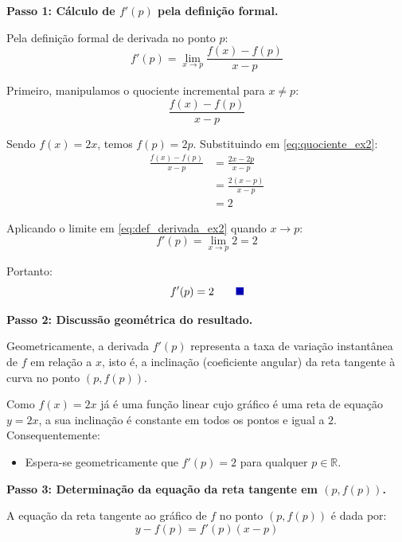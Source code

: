 \documentclass[12pt,a4paper]{article}
\newcommand{\qedsymbolmath}{\tag*{\textcolor{blue!70!black}{\rule{1.6ex}{1.6ex}}}}
\begin{document}
\textbf{Passo 1: Cálculo de $f'(p)$ pela definição formal.}

Pela definição formal de derivada no ponto $p$:
\begin{equation}
    f'(p) = \lim_{x \to p} \frac{f(x) - f(p)}{x - p} \label{eq:def_derivada_ex2}
\end{equation}

Primeiro, manipulamos o quociente incremental para $x \neq p$:
\begin{equation}
    \frac{f(x) - f(p)}{x - p} \label{eq:quociente_ex2}
\end{equation}

Sendo $f(x) = 2x$, temos $f(p) = 2p$. Substituindo em \eqref{eq:quociente_ex2}:
\begin{align*}
    \frac{f(x) - f(p)}{x - p} &= \frac{2x - 2p}{x - p} \\[0.25cm]
    &= \frac{2(x - p)}{x - p} \\[0.25cm]
    &= 2
\end{align*}

Aplicando o limite em \eqref{eq:def_derivada_ex2} quando $x \to p$:
\[
f'(p) = \lim_{x \to p} 2 = 2
\]

Portanto:
\begin{equation*}
    f'(p) = 2 \qedsymbolmath
\end{equation*}

\vspace{0.3cm}
\textbf{Passo 2: Discussão geométrica do resultado.}

Geometricamente, a derivada $f'(p)$ representa a taxa de variação instantânea de $f$ em relação a $x$, isto é, a inclinação (coeficiente angular) da reta tangente à curva no ponto $(p, f(p))$.

Como $f(x) = 2x$ já é uma função linear cujo gráfico é uma reta de equação $y = 2x$, a sua inclinação é constante em todos os pontos e igual a $2$. Consequentemente:
\begin{itemize}[noitemsep, topsep=2pt]
    \item Espera-se geometricamente que $f'(p) = 2$ para qualquer $p \in \mathbb{R}$.
\end{itemize}

\vspace{0.3cm}
\textbf{Passo 3: Determinação da equação da reta tangente em $(p, f(p))$.}

A equação da reta tangente ao gráfico de $f$ no ponto $(p, f(p))$ é dada por:
\begin{equation}
    y - f(p) = f'(p)(x - p) \label{eq:reta_tangente_ex2}
\end{equation}
\end{document}
